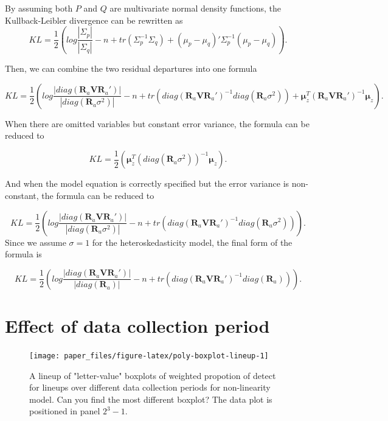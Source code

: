 \documentclass[]{interact}
\theoremstyle{plain}%
\theoremstyle{definition}
\theoremstyle{remark}
\begin{document}
By assuming both \(P\) and \(Q\) are multivariate normal density
functions, the Kullback-Leibler divergence can be rewritten as
\[KL = \frac{1}{2}\left(log\frac{|\Sigma_p|}{|\Sigma_q|} - n + tr(\Sigma_p^{-1}\Sigma_q) + (\mu_p - \mu_q)'\Sigma_p^{-1}(\mu_p - \mu_q)\right).\]

Then, we can combine the two residual departures into one formula

\small

\begin{equation}
\label{eq:effect-size}
KL = \frac{1}{2}\left(log\frac{|diag(\boldsymbol{R}_a\boldsymbol{V}\boldsymbol{R}_a')|}{|diag(\boldsymbol{R}_a\sigma^2)|} - n + tr(diag(\boldsymbol{R}_a\boldsymbol{V}\boldsymbol{R}_a')^{-1}diag(\boldsymbol{R}_a\sigma^2)) + \boldsymbol{\mu}_z^{T}(\boldsymbol{R}_a\boldsymbol{V}\boldsymbol{R}_a')^{-1}\boldsymbol{\mu}_z\right).
\end{equation}

\normalsize

When there are omitted variables but constant error variance, the
formula can be reduced to

\[KL = \frac{1}{2}\left(\boldsymbol{\mu}_z^{T}(diag(\boldsymbol{R}_a\sigma^2))^{-1}\boldsymbol{\mu}_z\right).\]

And when the model equation is correctly specified but the error
variance is non-constant, the formula can be reduced to

\[KL = \frac{1}{2}\left(log\frac{|diag(\boldsymbol{R}_a\boldsymbol{V}\boldsymbol{R}_a')|}{|diag(\boldsymbol{R}_a\sigma^2)|} - n + tr(diag(\boldsymbol{R}_a\boldsymbol{V}\boldsymbol{R}_a')^{-1}diag(\boldsymbol{R}_a\sigma^2))\right).\]
Since we assume \(\sigma = 1\) for the heteroskedasticity model, the
final form of the formula is

\[KL = \frac{1}{2}\left(log\frac{|diag(\boldsymbol{R}_a\boldsymbol{V}\boldsymbol{R}_a')|}{|diag(\boldsymbol{R}_a)|} - n + tr(diag(\boldsymbol{R}_a\boldsymbol{V}\boldsymbol{R}_a')^{-1}diag(\boldsymbol{R}_a))\right).\]

\hypertarget{effect-of-data-collection-period}{%
\section{Effect of data collection
period}\label{effect-of-data-collection-period}}

\begin{figure}

{\centering \texttt{[image: paper\_files/figure-latex/poly-boxplot-lineup-1]} 

}

\caption{A lineup of "letter-value" boxplots of weighted propotion of detect for lineups over different data collection periods for non-linearity model. Can you find the most different boxplot? The data plot is positioned in panel $2^3 - 1$.}\label{fig:poly-boxplot-lineup}
\end{figure}
\end{document}
